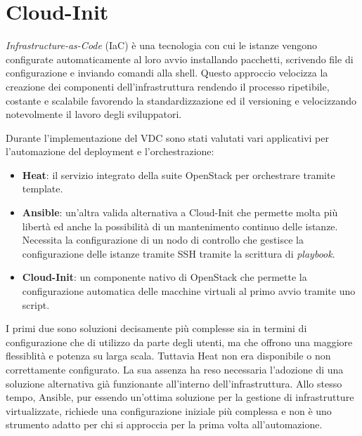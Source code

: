 \documentclass[12pt,a4paper,openright,twoside]{book}
\begin{document}
\section{Cloud-Init}
\textit{Infrastructure-as-Code} (IaC) è una tecnologia con cui le istanze vengono configurate automaticamente al loro avvio installando pacchetti, scrivendo file di configurazione e inviando comandi alla shell.
Questo approccio velocizza la creazione dei componenti dell'infrastruttura rendendo il processo ripetibile, costante e scalabile favorendo la standardizzazione ed il versioning e velocizzando notevolmente il lavoro degli sviluppatori.

Durante l'implementazione del VDC sono stati valutati vari applicativi per l'automazione del deployment e l'orchestrazione:
\begin{itemize}
    \item \textbf{Heat}: il servizio integrato della suite OpenStack per orchestrare tramite template.
    \item {
        \textbf{Ansible}: un'altra valida alternativa a Cloud-Init che permette molta più libertà ed anche la possibilità di un mantenimento continuo delle istanze. 
        Necessita la configurazione di un nodo di controllo che gestisce la configurazione delle istanze tramite SSH tramite la scrittura di \textit{playbook}.
    }
    \item{
        \textbf{Cloud-Init}: un componente nativo di OpenStack che permette la configurazione automatica delle macchine virtuali al primo avvio tramite uno script. 
    }
\end{itemize}

I primi due sono soluzioni decisamente più complesse sia in termini di configurazione che di utilizzo da parte degli utenti, ma che offrono una maggiore flessiblità e potenza su larga scala.
Tuttavia Heat non era disponibile o non correttamente configurato. La sua assenza ha reso necessaria l'adozione di una soluzione alternativa già funzionante all'interno dell'infrastruttura.
Allo stesso tempo, Ansible, pur essendo un'ottima soluzione per la gestione di infrastrutture virtualizzate, richiede una configurazione iniziale più complessa e non è uno strumento adatto per chi si approccia
per la prima volta all'automazione.
\end{document}
